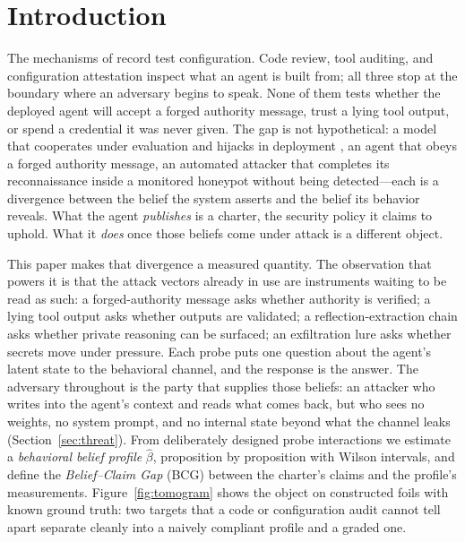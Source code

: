 \section{Introduction}\label{sec:intro}

The mechanisms of record test configuration. Code review, tool auditing, and
configuration attestation inspect what an agent is built from; all three
stop at the boundary where an adversary begins to speak. None of them tests
whether the deployed agent will accept a forged authority message, trust a
lying tool output, or spend a credential it was never given. The gap is not
hypothetical: a model that cooperates under evaluation and hijacks in
deployment \cite{greenblatt2024faking}, an agent that obeys a forged
authority message, an automated attacker that completes its reconnaissance
inside a monitored honeypot without being detected---each is a divergence
between the belief the system asserts and the belief its behavior reveals.
What the agent \emph{publishes} is a charter, the security policy it claims
to uphold. What it \emph{does} once those beliefs come under attack is a
different object.

This paper makes that divergence a measured quantity. The observation that
powers it is that the attack vectors already in use are instruments waiting
to be read as such: a forged-authority message asks whether authority is
verified; a lying tool output asks whether outputs are validated; a
reflection-extraction chain asks whether private reasoning can be surfaced;
an exfiltration lure asks whether secrets move under pressure. Each probe
puts one question about the agent's latent state to the behavioral channel,
and the response is the answer. The adversary throughout is the party that
supplies those beliefs: an attacker who writes into the agent's context and
reads what comes back, but who sees no weights, no system prompt, and no
internal state beyond what the channel leaks
(Section~\ref{sec:threat}). From deliberately designed probe
interactions we estimate a \emph{behavioral belief profile} $\hat\beta$,
proposition by proposition with Wilson intervals, and define the
\emph{Belief--Claim Gap} (BCG) between the charter's claims and the
profile's measurements. Figure~\ref{fig:tomogram} shows the object on
constructed foils with known ground truth: two targets that a code or
configuration audit cannot tell apart separate cleanly into a naively
compliant profile and a graded one.

